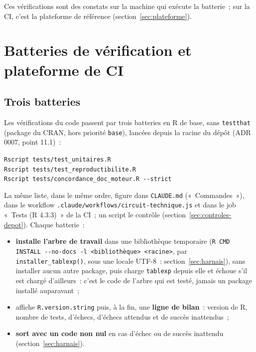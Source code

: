\documentclass[a4paper,11pt]{article}
\newcommand{\code}[1]{\texttt{\small #1}}
\begin{document}
\noindent
Ces vérifications sont des constats sur la machine qui exécute la batterie~;
sur la CI, c'est la plateforme de référence (section~\ref{sec:plateforme}).

\section{Batteries de vérification et plateforme de CI}
\label{sec:batteries}

\subsection{Trois batteries}
\label{sec:trois-batteries}

Les vérifications du code passent par trois batteries en R de base, sans
\code{testthat} (package du CRAN, hors priorité \code{base}), lancées depuis
la racine du dépôt (ADR 0007, point 11.1)~:

\begin{encadre}
\small
\code{Rscript tests/test\_unitaires.R}\\
\code{Rscript tests/test\_reproductibilite.R}\\
\code{Rscript tests/concordance\_doc\_moteur.R -{}-strict}
\end{encadre}

\noindent
La même liste, dans le même ordre, figure dans \code{CLAUDE.md}
(«~Commandes~»), dans le workflow \code{.claude/workflows/circuit-technique.js}
et dans le job «~Tests (R 4.3.3)~» de la CI~; un script le contrôle
(section~\ref{sec:controles-depot}). Chaque batterie~:

\begin{itemize}[leftmargin=*, itemsep=2pt]
  \item \textbf{installe l'arbre de travail} dans une bibliothèque temporaire
    (\code{R CMD INSTALL -{}-no-docs -l <bibliothèque> <racine>}, par
    \code{installer\_tablexp()}, sous une locale UTF-8~: section~\ref{sec:harnais}),
    sans installer aucun autre package, puis
    charge \code{tablexp} depuis elle et échoue s'il est chargé d'ailleurs~:
    c'est le code de l'arbre qui est testé, jamais un package installé
    auparavant~;
  \item affiche \code{R.version.string} puis, à la fin, une \textbf{ligne de
    bilan}~: version de R, nombre de tests, d'échecs, d'échecs attendus et de
    succès inattendus~;
  \item \textbf{sort avec un code non nul} en cas d'échec ou de succès
    inattendu (section~\ref{sec:harnais}).
\end{itemize}
\end{document}
